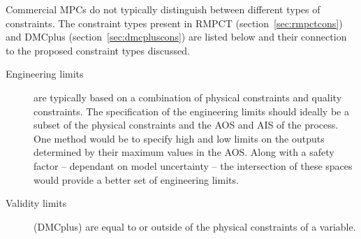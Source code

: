Commercial MPCs do not typically distinguish between different types of constraints.
The constraint types present in RMPCT (section~\ref{sec:rmpctcons}) and DMCplus (section~\ref{sec:dmcpluscons}) are listed below and their connection to the proposed constraint types discussed.
\begin{description}
  \item [Engineering limits] are typically based on a combination of physical constraints and quality constraints.
  The specification of the engineering limits should ideally be a subset of the physical constraints and the AOS and AIS of the process.
  One method would be to specify high and low limits on the outputs determined by their maximum values in the AOS.
  Along with a safety factor -- dependant on model uncertainty -- the intersection of these spaces would provide a better set of engineering limits.
  \item [Validity limits] (DMCplus) are equal to or outside of the physical constraints of a variable.
\end{description}



